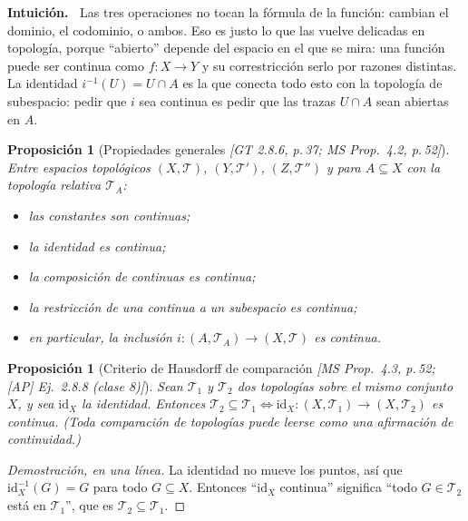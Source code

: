 \documentclass[11pt,a4paper]{article}
\newenvironment{intuicion}{\begin{cajaint}\small\textbf{Intuición.\ }}{\end{cajaint}}
\newenvironment{lista}{\leavevmode\begin{itemize}[leftmargin=1.5em,itemsep=1pt,topsep=2pt,parsep=0pt]}{\end{itemize}}
\theoremstyle{definition}
\theoremstyle{plain}
\newtheorem{proposicion}[definicion]{Proposición}
\newcommand{\fnt}[1]{{\normalfont\small\itshape\color{gray!150!black}[#1]}}
\newcommand{\tp}{\mathcal{T}}
\begin{document}
\begin{intuicion}
Las tres operaciones no tocan la fórmula de la función: cambian el dominio, el codominio, o ambos. Eso es justo lo que las vuelve delicadas en topología, porque ``abierto'' depende del espacio en el que se mira: una función puede ser continua como $f:X\to Y$ y su correstricción serlo por razones distintas. La identidad $i^{-1}(U)=U\cap A$ es la que conecta todo esto con la topología de subespacio: pedir que $i$ sea continua es pedir que las trazas $U\cap A$ sean abiertas en $A$.
\end{intuicion}

\begin{proposicion}[Propiedades generales \fnt{GT 2.8.6, p.\,37; MS Prop.\ 4.2, p.\,52}]
Entre espacios topológicos $(X,\tp)$, $(Y,\tp')$, $(Z,\tp'')$ y para $A\subseteq X$ con la topología relativa $\tp_A$:
\begin{lista}
\item las constantes son continuas;
\item la identidad es continua;
\item la composición de continuas es continua;
\item la restricción de una continua a un subespacio es continua;
\item en particular, la inclusión $i:(A,\tp_A)\to(X,\tp)$ es continua.
\end{lista}
\end{proposicion}

\begin{proposicion}[Criterio de Hausdorff de comparación \fnt{MS Prop.\ 4.3, p.\,52; [AP] Ej.\ 2.8.8 (clase 8)}]\label{pr:idcont}
Sean $\tp_1$ y $\tp_2$ dos topologías sobre el \emph{mismo} conjunto $X$, y sea $\mathrm{id}_X$ la identidad. Entonces $\tp_2\subseteq\tp_1\iff \mathrm{id}_X:(X,\tp_1)\to(X,\tp_2)$ es continua. (Toda comparación de topologías puede leerse como una afirmación de continuidad.)
\end{proposicion}

\begin{proof}[Demostración, en una línea]
La identidad no mueve los puntos, así que $\mathrm{id}_X^{-1}(G)=G$ para todo $G\subseteq X$. Entonces ``$\mathrm{id}_X$ continua'' significa ``todo $G\in\tp_2$ está en $\tp_1$'', que es $\tp_2\subseteq\tp_1$.
\end{proof}
\end{document}
